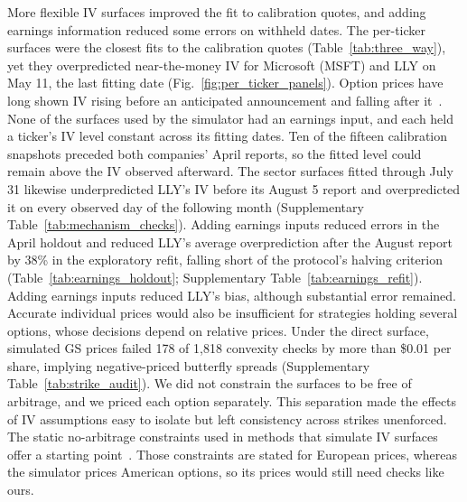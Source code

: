 More flexible IV surfaces improved the fit to calibration quotes, and adding earnings information reduced some errors on withheld dates. The per-ticker surfaces were the closest fits to the calibration quotes (Table~\ref{tab:three_way}), yet they overpredicted near-the-money IV for Microsoft (MSFT) and LLY on May 11, the last fitting date (Fig.~\ref{fig:per_ticker_panels}). Option prices have long shown IV rising before an anticipated announcement and falling after it~\cite{patell1979,dubinsky2019}. None of the surfaces used by the simulator had an earnings input, and each held a ticker's IV level constant across its fitting dates. Ten of the fifteen calibration snapshots preceded both companies' April reports, so the fitted level could remain above the IV observed afterward. The sector surfaces fitted through July 31 likewise underpredicted LLY's IV before its August 5 report and overpredicted it on every observed day of the following month (Supplementary Table~\ref{tab:mechanism_checks}). Adding earnings inputs reduced errors in the April holdout and reduced LLY's average overprediction after the August report by 38\% in the exploratory refit, falling short of the protocol's halving criterion (Table~\ref{tab:earnings_holdout}; Supplementary Table~\ref{tab:earnings_refit}). Adding earnings inputs reduced LLY's bias, although substantial error remained. Accurate individual prices would also be insufficient for strategies holding several options, whose decisions depend on relative prices. Under the direct surface, simulated GS prices failed 178 of 1{,}818 convexity checks by more than \$0.01 per share, implying negative-priced butterfly spreads (Supplementary Table~\ref{tab:strike_audit}). We did not constrain the surfaces to be free of arbitrage, and we priced each option separately. This separation made the effects of IV assumptions easy to isolate but left consistency across strikes unenforced. The static no-arbitrage constraints used in methods that simulate IV surfaces offer a starting point~\cite{cont2023}. Those constraints are stated for European prices, whereas the simulator prices American options, so its prices would still need checks like ours.

